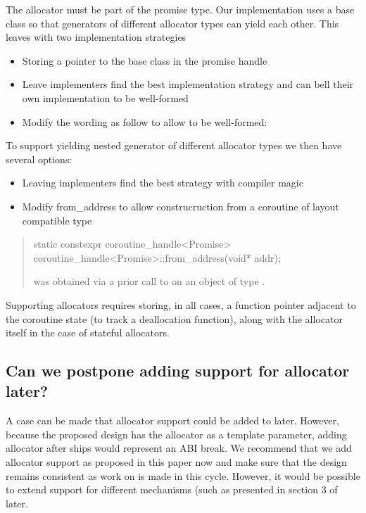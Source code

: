 \documentclass{wg21}
\begin{document}
The allocator must be part of the promise type.
Our implementation uses a base class so that generators of different allocator types can yield each other.
This leaves with two implementation strategies
\begin{itemize}
\item Storing a pointer to the base class in the promise handle
\item Leave implementers find the best implementation strategy and can bell their own implementation to be well-formed
\item Modify the wording as follow to allow  to be well-formed:
\end{itemize}

To support yielding nested generator of different allocator types we then have several options:
\begin{itemize}
\item Leaving implementers find the best strategy with compiler magic
\item Modify from_address to allow construcruction from a coroutine of layout compatible type
\end{itemize}
\begin{quote}
%
\begin{itemdecl}
static constexpr coroutine_handle<Promise> coroutine_handle<Promise>::from_address(void* addr);
\end{itemdecl}

\begin{itemdescr}
\expects
{} was obtained via a prior call to 
on an object of type \cv {}.
\end{itemdescr}
\end{quote}

Supporting allocators requires storing, in all cases, a function pointer adjacent to the coroutine state (to track a deallocation function),
along with the allocator itself in the case of stateful allocators.


\subsection{Can we postpone adding support for allocator later?}

A case can be made that allocator support could be added to  later.
However, because the proposed design has the allocator as a template parameter,
adding allocator after  ships would represent an ABI break.
We recommend that we add allocator support as proposed in this paper now and make sure that the design remains consistent as work on 
is made in this cycle.
However, it would be possible to extend support for different mechanisms (such as presented in section 3 of  later.
\end{document}
